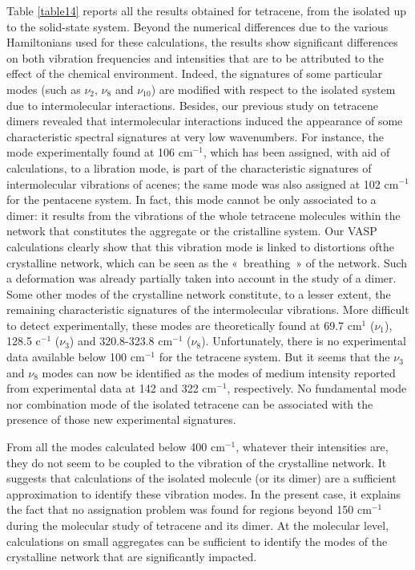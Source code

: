  Table \ref{table14} reports all the results obtained for tetracene, from the isolated up to the solid-state system. Beyond the numerical differences due to the various Hamiltonians used for these calculations, the results show significant differences on both vibration frequencies and intensities that are to be attributed to the effect of the chemical environment. Indeed, the signatures of some particular modes (such as $\nu_{2}$, $\nu_{8}$ and $\nu_{10}$) are modified with respect to the isolated system due to intermolecular interactions. Besides, our previous study on tetracene dimers revealed that intermolecular interactions induced the appearance of some characteristic spectral signatures at very low wavenumbers. For instance, the mode experimentally found at 106 cm$^{-1}$, which has been assigned, with aid of calculations, to a libration mode, is part of the characteristic signatures of intermolecular vibrations of acenes; the same mode was also assigned at 102 cm$^{-1}$ for the pentacene system. In fact, this mode cannot be only associated to a dimer: it results from the vibrations of the whole tetracene molecules within the network that constitutes the aggregate or the cristalline system. Our VASP calculations clearly show that this vibration mode is linked to distortions ofthe  crystalline network, which can be seen as the « breathing » of the network. Such a deformation was already partially taken into account in the study of a dimer. Some other modes of the crystalline network constitute, to a lesser extent, the remaining characteristic signatures of the intermolecular vibrations. More difficult to detect experimentally, these modes are theoretically found at 69.7 cm$^{1}$ ($\nu_{1}$), 128.5 c$^{-1}$ ($\nu_{3}$) and 320.8-323.8 cm$^{-1}$ ($\nu_{8}$). Unfortunately, there is no experimental data available below 100 cm$^{-1}$ for the tetracene system. But it seems that the $\nu_{3}$ and $\nu_{8}$ modes can now be identified as the modes of medium intensity reported from experimental data at 142 and 322 cm$^{-1}$, respectively. No fundamental mode nor combination mode of the isolated tetracene can be associated with the presence of those new experimental signatures.
 
 From all the modes calculated below 400 cm$^{-1}$, whatever their intensities are, they do not seem to be coupled to the vibration of the crystalline network. It suggests that calculations of the isolated molecule (or its dimer) are a sufficient approximation to identify these vibration modes. In the present case, it explains the fact that no assignation problem was found for regions beyond 150 cm$^{-1}$ during the molecular study of tetracene and its dimer. At the molecular level, calculations on small aggregates can be sufficient to identify the modes of the crystalline network that are significantly impacted.
 
